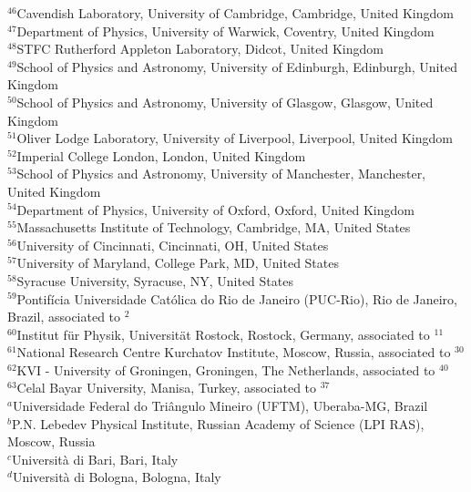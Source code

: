 \documentclass[12pt,a4paper]{article}
\begin{document}
\begin{flushleft}
{$ ^{46}$Cavendish Laboratory, University of Cambridge, Cambridge, United Kingdom\\
$ ^{47}$Department of Physics, University of Warwick, Coventry, United Kingdom\\
$ ^{48}$STFC Rutherford Appleton Laboratory, Didcot, United Kingdom\\
$ ^{49}$School of Physics and Astronomy, University of Edinburgh, Edinburgh, United Kingdom\\
$ ^{50}$School of Physics and Astronomy, University of Glasgow, Glasgow, United Kingdom\\
$ ^{51}$Oliver Lodge Laboratory, University of Liverpool, Liverpool, United Kingdom\\
$ ^{52}$Imperial College London, London, United Kingdom\\
$ ^{53}$School of Physics and Astronomy, University of Manchester, Manchester, United Kingdom\\
$ ^{54}$Department of Physics, University of Oxford, Oxford, United Kingdom\\
$ ^{55}$Massachusetts Institute of Technology, Cambridge, MA, United States\\
$ ^{56}$University of Cincinnati, Cincinnati, OH, United States\\
$ ^{57}$University of Maryland, College Park, MD, United States\\
$ ^{58}$Syracuse University, Syracuse, NY, United States\\
$ ^{59}$Pontif\'{i}cia Universidade Cat\'{o}lica do Rio de Janeiro (PUC-Rio), Rio de Janeiro, Brazil, associated to $^{2}$\\
$ ^{60}$Institut f\"{u}r Physik, Universit\"{a}t Rostock, Rostock, Germany, associated to $^{11}$\\
$ ^{61}$National Research Centre Kurchatov Institute, Moscow, Russia, associated to $^{30}$\\
$ ^{62}$KVI - University of Groningen, Groningen, The Netherlands, associated to $^{40}$\\
$ ^{63}$Celal Bayar University, Manisa, Turkey, associated to $^{37}$\\
\bigskip
$ ^{a}$Universidade Federal do Tri\^{a}ngulo Mineiro (UFTM), Uberaba-MG, Brazil\\
$ ^{b}$P.N. Lebedev Physical Institute, Russian Academy of Science (LPI RAS), Moscow, Russia\\
$ ^{c}$Universit\`{a} di Bari, Bari, Italy\\
$ ^{d}$Universit\`{a} di Bologna, Bologna, Italy\\
}
\end{flushleft}
\end{document}
